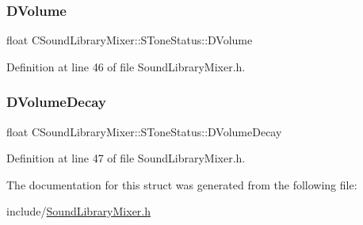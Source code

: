 \subsubsection{\texorpdfstring{D\+Volume}{DVolume}}
{\footnotesize\ttfamily float C\+Sound\+Library\+Mixer\+::\+S\+Tone\+Status\+::\+D\+Volume}



Definition at line 46 of file Sound\+Library\+Mixer.\+h.

\hypertarget{structCSoundLibraryMixer_1_1SToneStatus_aa4b4dcadb27364e176769e4f0b15a6c9}{}\label{structCSoundLibraryMixer_1_1SToneStatus_aa4b4dcadb27364e176769e4f0b15a6c9} 
\subsubsection{\texorpdfstring{D\+Volume\+Decay}{DVolumeDecay}}
{\footnotesize\ttfamily float C\+Sound\+Library\+Mixer\+::\+S\+Tone\+Status\+::\+D\+Volume\+Decay}



Definition at line 47 of file Sound\+Library\+Mixer.\+h.



The documentation for this struct was generated from the following file\+:\begin{DoxyCompactItemize}
\item 
include/\hyperlink{SoundLibraryMixer_8h}{Sound\+Library\+Mixer.\+h}\end{DoxyCompactItemize}
